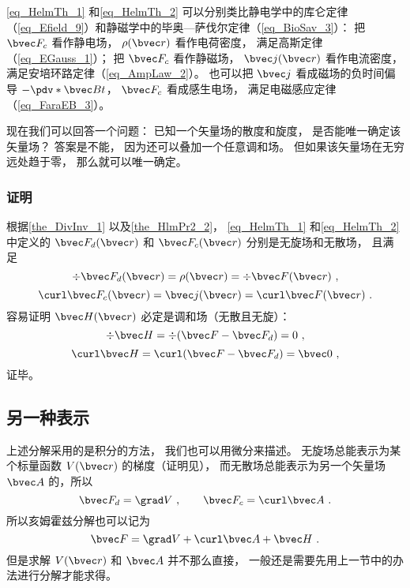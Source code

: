 \autoref{eq_HelmTh_1} 和\autoref{eq_HelmTh_2} 可以分别类比静电学中的库仑定律（\autoref{eq_Efield_9}）和静磁学中的毕奥—萨伐尔定律（\autoref{eq_BioSav_3}）： 把 $\bvec F_c$ 看作静电场， $\rho(\bvec r)$ 看作电荷密度， 满足高斯定律（\autoref{eq_EGauss_1}）； 把 $\bvec F_c$ 看作静磁场， $\bvec j(\bvec r)$ 看作电流密度， 满足安培环路定律（\autoref{eq_AmpLaw_2}）。 也可以把 $\bvec j$ 看成磁场的负时间偏导 $-\pdv*{\bvec B}{t}$， $\bvec F_c$ 看成感生电场， 满足电磁感应定律（\autoref{eq_FaraEB_3}）。

现在我们可以回答一个问题： 已知一个矢量场的散度和旋度， 是否能唯一确定该矢量场？ 答案是不能， 因为还可以叠加一个任意调和场。 但如果该矢量场在无穷远处趋于零， 那么就可以唯一确定。

\subsubsection{证明}
根据\autoref{the_DivInv_1} 以及\autoref{the_HlmPr2_2}， \autoref{eq_HelmTh_1} 和\autoref{eq_HelmTh_2} 中定义的 $\bvec F_{d}(\bvec r)$ 和 $\bvec F_{c}(\bvec r)$ 分别是无旋场和无散场， 且满足
\begin{equation}
\div \bvec F_d(\bvec r) = \rho(\bvec r) = \div \bvec F(\bvec r)~,
\end{equation}
\begin{equation}
\curl \bvec F_c(\bvec r) = \bvec j(\bvec r) = \curl \bvec F(\bvec r)~.
\end{equation}
容易证明 $\bvec H(\bvec r)$ 必定是调和场（无散且无旋）：
\begin{equation}
\div \bvec H = \div (\bvec F - \bvec F_d) = 0~,
\end{equation}
\begin{equation}
\curl \bvec H = \curl (\bvec F - \bvec F_d) = \bvec 0~,
\end{equation}
证毕。

\subsection{另一种表示}
上述分解采用的是积分的方法， 我们也可以用微分来描述。 无旋场总能表示为某个标量函数 $V(\bvec r)$ 的梯度（证明见）， 而无散场总能表示为另一个矢量场 $\bvec A$ 的，所以
\begin{equation}
\bvec F_{d} = \grad V~,\qquad \bvec F_{c} = \curl \bvec A~.
\end{equation}
所以亥姆霍兹分解也可以记为
\begin{equation}
\bvec F = \grad V + \curl \bvec A + \bvec H~.
\end{equation}
但是求解 $V(\bvec r)$ 和 $\bvec A$ 并不那么直接， 一般还是需要先用上一节中的办法进行分解才能求得。
